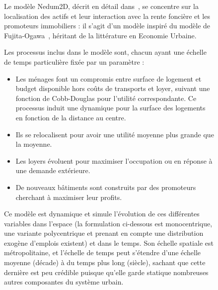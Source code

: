 \begin{figure}
	\begin{mdframed}
	
	Le modèle Nedum2D, décrit en détail dans~\cite{viguie2014downscaling}, se concentre sur la localisation des actifs et leur interaction avec la rente foncière et les promoteurs immobiliers : il s'agit d'un modèle inspiré du modèle de Fujita-Ogawa~\cite{fujita1982multiple}, héritant de la littérature en Economie Urbaine.
	
	Les processus inclus dans le modèle sont, chacun ayant une échelle de temps particulière fixée par un paramètre :
	\begin{itemize}
		\item Les ménages font un compromis entre surface de logement et budget disponible hors coûts de transports et loyer, suivant une fonction de Cobb-Douglas pour l'utilité correspondante. Ce processus induit une dynamique pour la surface des logements en fonction de la distance au centre.
		\item Ils se relocalisent pour avoir une utilité moyenne plus grande que la moyenne.
		\item Les loyers évoluent pour maximiser l'occupation ou en réponse à une demande extérieure.
		\item De nouveaux bâtiments sont construits par des promoteurs cherchant à maximiser leur profits.
	\end{itemize}
	
	Ce modèle est dynamique et simule l'évolution de ces différentes variables dans l'espace (la formulation ci-dessous est monocentrique, une variante polycentrique et prenant en compte une distribution exogène d'emplois existent) et dans le temps. Son échelle spatiale est métropolitaine, et l'échelle de temps peut s'étendre d'une échelle moyenne (décade) à du temps plus long (siècle), sachant que cette dernière est peu crédible puisque qu'elle garde statique nombreuses autres composantes du système urbain.
	
	\medskip
	

\end{mdframed}
\end{figure}
